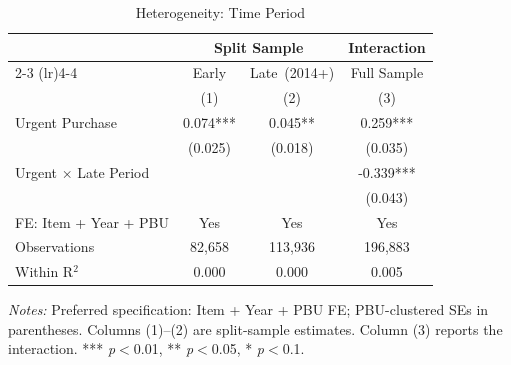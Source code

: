 \begin{table}[ht]
  \centering
  \caption{Heterogeneity: Time Period}
  \label{tab:het_period}
  \small
  \begin{threeparttable}
  \begin{tabular}{lccc}
    \hline\hline
    & \multicolumn{2}{c}{Split Sample} & Interaction \\
    \cmidrule(lr){2-3} \cmidrule(lr){4-4}
    & Early & Late~(2014+) & Full Sample \\
    & (1) & (2) & (3) \\
    \hline
    Urgent Purchase & 0.074*** & 0.045** & 0.259*** \\
     & (0.025) & (0.018) & (0.035) \\[3pt]
    Urgent × Late Period &  &  & -0.339*** \\
     &  &  & (0.043) \\[3pt]
    \hline
    FE: Item + Year + PBU & Yes & Yes & Yes \\
    Observations & 82,658 & 113,936 & 196,883 \\
    Within R$^2$ & 0.000 & 0.000 & 0.005 \\
    \hline\hline
  \end{tabular}
  \begin{tablenotes}
    \small
    \item \textit{Notes:} Preferred specification: Item + Year + PBU FE; PBU-clustered SEs in parentheses. Columns (1)--(2) are split-sample estimates. Column (3) reports the interaction. *** \textit{p}$<$0.01, ** \textit{p}$<$0.05, * \textit{p}$<$0.1.
  \end{tablenotes}
  \end{threeparttable}
\end{table}
